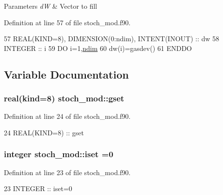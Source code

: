 \begin{DoxyParams}{Parameters}
{\em dW} & Vector to fill \\
\hline
\end{DoxyParams}


Definition at line 57 of file stoch\+\_\+mod.\+f90.


\begin{DoxyCode}
57     \textcolor{keywordtype}{REAL(KIND=8)}, \textcolor{keywordtype}{DIMENSION(0:ndim)}, \textcolor{keywordtype}{INTENT(INOUT)} :: dw
58     \textcolor{keywordtype}{INTEGER} :: i
59     \textcolor{keywordflow}{DO} i=1,\hyperlink{namespaceparams_a2323fe1773f086e20c14f266351c482b}{ndim}
60        dw(i)=gasdev()
61 \textcolor{keywordflow}{    ENDDO}
\end{DoxyCode}


\subsection{Variable Documentation}
\subsubsection[{\texorpdfstring{gset}{gset}}]{\setlength{\rightskip}{0pt plus 5cm}real(kind=8) stoch\+\_\+mod\+::gset\hspace{0.3cm}{\ttfamily [private]}}\hypertarget{namespacestoch__mod_a15f89f8abf449fad0aea548852af1e60}{}\label{namespacestoch__mod_a15f89f8abf449fad0aea548852af1e60}


Definition at line 24 of file stoch\+\_\+mod.\+f90.


\begin{DoxyCode}
24   \textcolor{keywordtype}{REAL(KIND=8)} :: gset
\end{DoxyCode}
\subsubsection[{\texorpdfstring{iset}{iset}}]{\setlength{\rightskip}{0pt plus 5cm}integer stoch\+\_\+mod\+::iset =0\hspace{0.3cm}{\ttfamily [private]}}\hypertarget{namespacestoch__mod_a266187af9a49e162926a5ef2d67e141a}{}\label{namespacestoch__mod_a266187af9a49e162926a5ef2d67e141a}


Definition at line 23 of file stoch\+\_\+mod.\+f90.


\begin{DoxyCode}
23   \textcolor{keywordtype}{INTEGER} :: iset=0
\end{DoxyCode}

